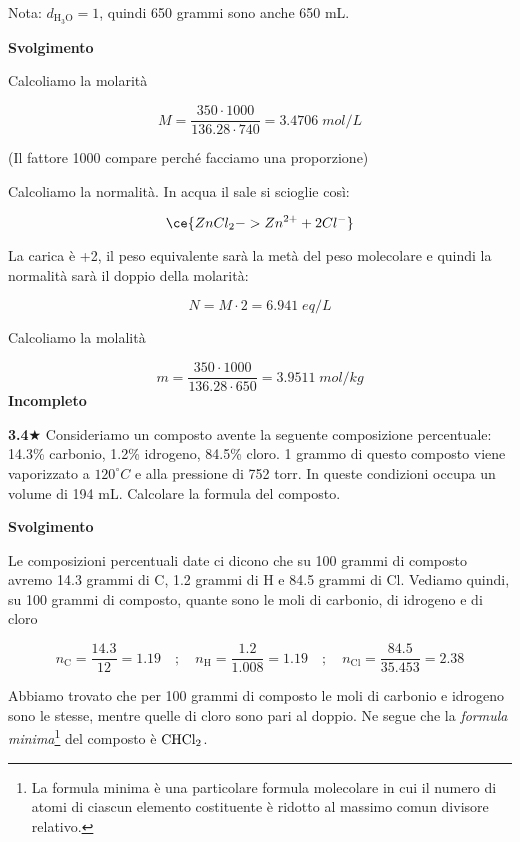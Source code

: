 \vspace{0.2cm}Nota: $d_{\text{H}_3\text{O}}=1$, quindi 650 grammi sono anche 650 mL.

\vspace{0.2cm}\large\textbf{Svolgimento}\normalsize

\vspace{0.2cm}Calcoliamo la molarità

$$M=\frac{350 \cdot 1000}{136.28 \cdot 740}=3.4706\;mol/L$$

(Il fattore 1000 compare perché facciamo una proporzione)

Calcoliamo la normalità. In acqua il sale si scioglie così:

$$\ce{ZnCl_2 -> Zn^{2+} + 2Cl^-}$$

La carica è +2, il peso equivalente sarà la metà del peso molecolare e quindi la normalità sarà il doppio della molarità:

$$N=M \cdot 2=6.941\;eq/L$$

Calcoliamo la molalità

$$m=\frac{350 \cdot 1000}{136.28 \cdot 650}=3.9511\;mol/kg$$
\textbf{Incompleto}

\vspace{0.2cm}\textbf{3.4}$\bigstar$ Consideriamo un composto avente la seguente composizione percentuale: 14.3\% carbonio, 1.2\% idrogeno, 84.5\% cloro. 1 grammo di questo composto viene vaporizzato a $120^{\circ}C$ e alla pressione di 752 torr. In queste condizioni occupa un volume di 194 mL. Calcolare la formula del composto.

\vspace{0.2cm}\large\textbf{Svolgimento}\normalsize

\vspace{0.2cm}Le composizioni percentuali date ci dicono che su 100 grammi di composto avremo 14.3 grammi di C, 1.2 grammi di H e 84.5 grammi di Cl. Vediamo quindi, su 100 grammi di composto, quante sono le moli di carbonio, di idrogeno e di cloro

$$n_{\text{C}}=\frac{14.3}{12}=1.19
\quad;\quad
n_{\text{H}}=\frac{1.2}{1.008}=1.19
\quad;\quad
n_{\text{Cl}}=\frac{84.5}{35.453}=2.38$$

Abbiamo trovato che per 100 grammi di composto le moli di carbonio e idrogeno sono le stesse, mentre quelle di cloro sono pari al doppio. Ne segue che la \textit{formula minima}\footnote{La formula minima è una particolare formula molecolare in cui il numero di atomi di ciascun elemento costituente è ridotto al massimo comun divisore relativo.} del composto è $\rm CHCl_2$.

